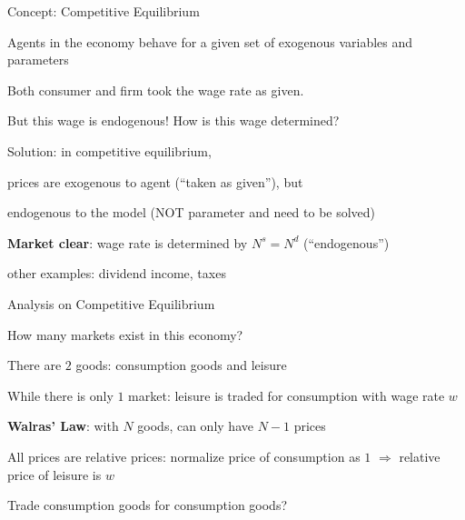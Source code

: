 \documentclass[11pt,aspectratio=169,usenames,dvipsnames]{beamer}
\let\tempone\itemize
\let\temptwo\enditemize
\renewenvironment{itemize}{\tempone\addtolength{\itemsep}{\fill}}{\temptwo}
\begin{document}
\begin{frame}{Concept: Competitive Equilibrium}
\label{slide:Concept__Competitive_Equilibrium}
\begin{itemize}
    \item Agents in the economy behave for a \alert{given} set of \alert{exogenous variables} and \alert{parameters}
    \item Both consumer and firm \alert{took the wage rate as given}.
    \item But this wage is \alert{endogenous}! How is this wage determined?
    \item Solution: in competitive equilibrium,
    \begin{itemize}
        \item prices are \alert{exogenous to agent} (``taken as given''), but
        \item \alert{endogenous to the model} (NOT parameter and need to be solved)
    \end{itemize}
    \item \textbf{Market clear}: wage rate is determined by $ N^{s} = N^{d} $ (``endogenous'')
    \item other examples: dividend income, taxes
\end{itemize}

\end{frame}

\begin{frame}{Analysis on Competitive Equilibrium}
\label{slide:Analysis_on_Competitive_Equilibrium}
\begin{itemize}
    \item How many markets exist in this economy?
    \begin{itemize}
        \item There are $ 2 $ goods: consumption goods and leisure
        \item While there is only $ 1 $ market: leisure is traded for consumption with wage rate $ w $
    \end{itemize}
    \item \textbf{Walras' Law}: with $ N $ goods, can only have $ N-1 $ prices
    \begin{itemize}
        \item All prices are \alert{relative prices}: \alert{normalize} price of consumption as $ 1 $ $ \Rightarrow  $ relative price of leisure is $ w $
        \item Trade consumption goods for consumption goods?
    \end{itemize}
\end{itemize}
\end{frame}
\end{document}
